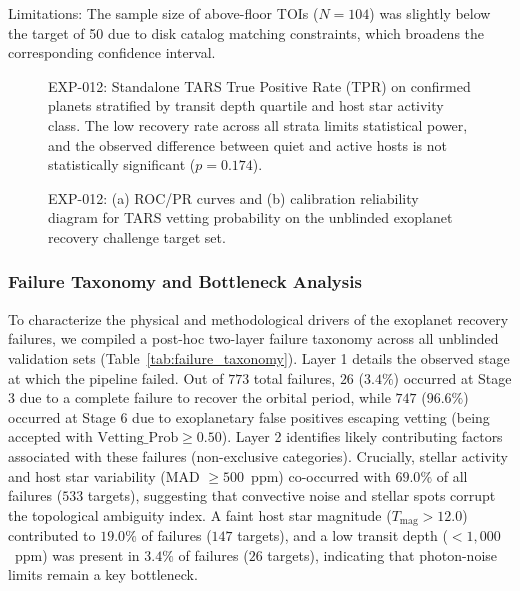 Limitations: The sample size of above-floor TOIs ($N = 104$) was slightly below the target of 50 due to disk catalog matching constraints, which broadens the corresponding confidence interval.

\begin{figure}[htbp]
\centering
{}
\caption{EXP-012: Standalone TARS True Positive Rate (TPR) on confirmed planets stratified by transit depth quartile and host star activity class. The low recovery rate across all strata limits statistical power, and the observed difference between quiet and active hosts is not statistically significant ($p = 0.174$).}
\label{fig:exp012_stratified}
\end{figure}

\begin{figure}[htbp]
\centering
{}
\caption{EXP-012: (a) ROC/PR curves and (b) calibration reliability diagram for TARS vetting probability on the unblinded exoplanet recovery challenge target set.}
\label{fig:exp012_roc_cal}
\end{figure}

\subsubsection{Failure Taxonomy and Bottleneck Analysis}
To characterize the physical and methodological drivers of the exoplanet recovery failures, we compiled a post-hoc two-layer failure taxonomy across all unblinded validation sets (Table~\ref{tab:failure_taxonomy}). 
Layer 1 details the observed stage at which the pipeline failed. Out of $773$ total failures, $26$ ($3.4\%$) occurred at Stage 3 due to a complete failure to recover the orbital period, while $747$ ($96.6\%$) occurred at Stage 6 due to exoplanetary false positives escaping vetting (being accepted with $\text{Vetting\_Prob} \ge 0.50$).
Layer 2 identifies likely contributing factors associated with these failures (non-exclusive categories). Crucially, stellar activity and host star variability (MAD $\ge 500$~ppm) co-occurred with $69.0\%$ of all failures ($533$ targets), suggesting that convective noise and stellar spots corrupt the topological ambiguity index. A faint host star magnitude ($T_{\text{mag}} > 12.0$) contributed to $19.0\%$ of failures ($147$ targets), and a low transit depth ($<1{,}000$~ppm) was present in $3.4\%$ of failures ($26$ targets), indicating that photon-noise limits remain a key bottleneck.


